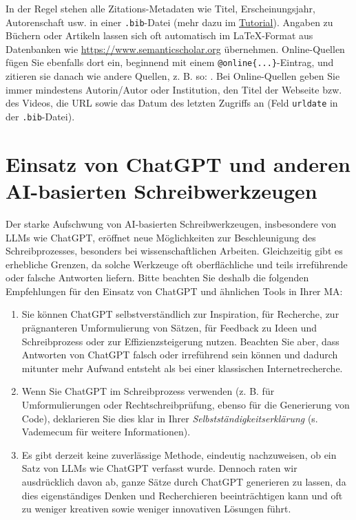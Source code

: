 In der Regel stehen alle Zitations-Metadaten wie Titel, Erscheinungsjahr, Autorenschaft usw. in einer \texttt{.bib}-Datei (mehr dazu im \href{https://de.overleaf.com/learn/latex/Bibliography_management_with_biblatex}{Tutorial}). Angaben zu Büchern oder Artikeln lassen sich oft automatisch im \LaTeX{}-Format aus Datenbanken wie \url{https://www.semanticscholar.org} übernehmen. Online-Quellen fügen Sie ebenfalls dort ein, beginnend mit einem \lstinline|@online{...}|-Eintrag, und zitieren sie danach wie andere Quellen, z. B. so: \cite{Datenstrukturen}. Bei Online-Quellen geben Sie immer mindestens Autorin/Autor oder Institution, den Titel der Webseite bzw. des Videos, die \gls{URL} sowie das Datum des letzten Zugriffs an (Feld \lstinline|urldate| in der \texttt{.bib}-Datei).

\section{Einsatz von ChatGPT und anderen \acrshort{AI}-basierten Schreibwerkzeugen}

Der starke Aufschwung von \gls{AI}-basierten Schreibwerkzeugen, insbesondere von \glspl{LLM} wie ChatGPT, eröffnet neue Möglichkeiten zur Beschleunigung des Schreibprozesses, besonders bei wissenschaftlichen Arbeiten. Gleichzeitig gibt es erhebliche Grenzen, da solche Werkzeuge oft oberflächliche und teils irreführende oder falsche Antworten liefern. Bitte beachten Sie deshalb die folgenden Empfehlungen für den Einsatz von ChatGPT und ähnlichen Tools in Ihrer \gls{MA}:

\begin{enumerate}
	\item Sie können ChatGPT selbstverständlich zur Inspiration, für Recherche, zur prägnanteren Umformulierung von Sätzen, für Feedback zu Ideen und Schreibprozess oder zur Effizienzsteigerung nutzen. Beachten Sie aber, dass Antworten von ChatGPT falsch oder irreführend sein können und dadurch mitunter mehr Aufwand entsteht als bei einer klassischen Internetrecherche.
	\item Wenn Sie ChatGPT im Schreibprozess verwenden (z. B. für Umformulierungen oder Rechtschreibprüfung, ebenso für die Generierung von Code), deklarieren Sie dies klar in Ihrer \textit{Selbstständigkeitserklärung} (s. Vademecum für weitere Informationen).
	\item Es gibt derzeit keine zuverlässige Methode, eindeutig nachzuweisen, ob ein Satz von \glspl{LLM} wie ChatGPT verfasst wurde. Dennoch raten wir ausdrücklich davon ab, ganze Sätze durch ChatGPT generieren zu lassen, da dies eigenständiges Denken und Recherchieren beeinträchtigen kann und oft zu weniger kreativen sowie weniger innovativen Lösungen führt.
\end{enumerate}


